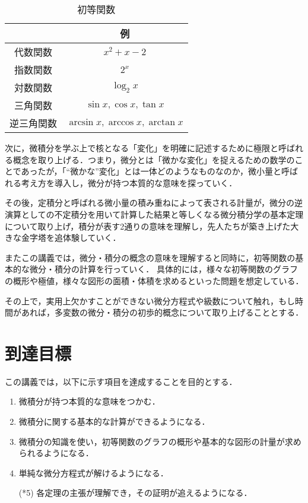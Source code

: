 \begin{table}[!h]
	\centering
	\caption{初等関数}
	\label{table:ele_func}
	\begin{tabular}{c|c}
		& 例 \\
		\hline
		代数関数 & $x^2 + x - 2$ \\
		指数関数 & $2^x$ \\
		対数関数 & $\log_2{x}$ \\
		三角関数 & $\sin x, \cos x, \tan x$ \\
		逆三角関数 & $\arcsin x, \arccos x, \arctan x$ \\
	\end{tabular}
\end{table}

次に，微積分を学ぶ上で核となる「変化」を明確に記述するために極限と呼ばれる概念を取り上げる．つまり，微分とは「微かな変化」を捉えるための数学のことであったが，「``微かな''変化」とは一体どのようなものなのか，微小量と呼ばれる考え方を導入し，微分が持つ本質的な意味を探っていく．

その後，定積分と呼ばれる微小量の積み重ねによって表される計量が，微分の逆演算としての不定積分を用いて計算した結果と等しくなる微分積分学の基本定理について取り上げ，積分が表す2通りの意味を理解し，先人たちが築き上げた大きな金字塔を追体験していく．

またこの講義では，微分・積分の概念の意味を理解すると同時に，初等関数の基本的な微分・積分の計算を行っていく．
具体的には，様々な初等関数のグラフの概形や極値，様々な図形の面積・体積を求めるといった問題を想定している．

その上で，実用上欠かすことができない微分方程式や級数について触れ，もし時間があれば，多変数の微分・積分の初歩的概念について取り上げることとする．

\section{到達目標}
この講義では，以下に示す項目を達成することを目的とする．
\begin{enumerate}[(1)]
	\item 微積分が持つ本質的な意味をつかむ．
	\item 微積分に関する基本的な計算ができるようになる．
	\item 微積分の知識を使い，初等関数のグラフの概形や基本的な図形の計量が求められるようになる．
	\item 単純な微分方程式が解けるようになる．
	\item[(*5)] 各定理の主張が理解でき，その証明が追えるようになる．
\end{enumerate}

